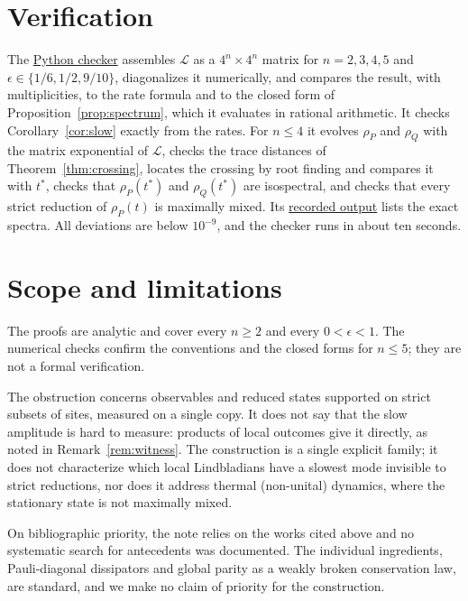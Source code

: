 \documentclass[11pt,a4paper]{article}
\theoremstyle{definition}
\theoremstyle{plain}
\newcommand{\cL}{\mathcal{L}}
\begin{document}
\section{Verification}\label{sec:verification}
The
\href{https://github.com/jpbruneton/open_quantum_problems/blob/main/research/entries/locally-invisible-mpemba-mode/checks/verify_mpemba_mode.py}{Python checker}
assembles $\cL$ as a $4^n\times4^n$ matrix for $n=2,3,4,5$ and
$\epsilon\in\{1/6,1/2,9/10\}$, diagonalizes it numerically, and compares
the result, with multiplicities, to the rate formula and to the closed form
of Proposition~\ref{prop:spectrum}, which it evaluates in rational
arithmetic. It checks Corollary~\ref{cor:slow} exactly from the rates. For
$n\le4$ it evolves $\rho_P$ and $\rho_Q$ with the matrix exponential of
$\cL$, checks the trace distances of Theorem~\ref{thm:crossing}, locates the
crossing by root finding and compares it with $t^*$, checks that
$\rho_P(t^*)$ and $\rho_Q(t^*)$ are isospectral, and checks that every
strict reduction of $\rho_P(t)$ is maximally mixed. Its
\href{https://github.com/jpbruneton/open_quantum_problems/blob/main/research/entries/locally-invisible-mpemba-mode/data/verification.json}{recorded output}
lists the exact spectra. All deviations are below $10^{-9}$, and the checker
runs in about ten seconds.

\section{Scope and limitations}\label{sec:scope}
The proofs are analytic and cover every $n\ge2$ and every $0<\epsilon<1$.
The numerical checks confirm the conventions and the closed forms for
$n\le5$; they are not a formal verification.

The obstruction concerns observables and reduced states supported on strict
subsets of sites, measured on a single copy. It does not say that the slow
amplitude is hard to measure: products of local outcomes give it directly,
as noted in Remark~\ref{rem:witness}. The construction is a single explicit
family; it does not characterize which local Lindbladians have a slowest
mode invisible to strict reductions, nor does it address thermal (non-unital)
dynamics, where the stationary state is not maximally mixed.

On bibliographic priority, the note relies on the works cited above and no
systematic search for antecedents was documented. The individual
ingredients, Pauli-diagonal dissipators and global parity as a weakly broken
conservation law, are standard, and we make no claim of priority for the
construction.
\end{document}
